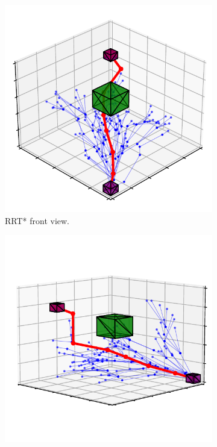 \documentclass{ctuthesis}
\begin{document}
\begin{figure}[!ht]
  \centering 
  \begin{subfigure}[b]{0.49\textwidth}
      \includegraphics[width=\textwidth]{figChap4/6D_RRTstar173it_loc_m135to35.pdf}
      \caption{RRT* front view.}
      \label{fig:rrtstar3D_maze_front}
  \end{subfigure}  
  \begin{subfigure}[b]{0.49\textwidth}
      \includegraphics[width=\textwidth]{figChap4/6D_RRTstar1773it_loc_135to10.pdf}

\end{subfigure}
\end{figure}
\end{document}
